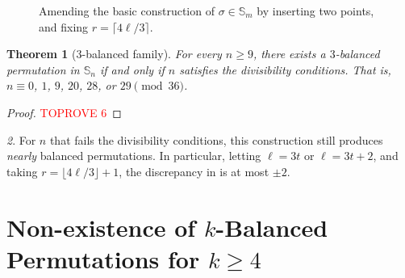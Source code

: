 \documentclass{article}
\newtheorem{theorem}{Theorem}[section]
\newcommand{\threeb}{$3$-balanced\xspace}
\newcommand{\Sn}{\mathbb{S}_n}
\theoremstyle{remark}
\newtheorem{rem}[theorem]{\protect\remarkname}
\providecommand{\remarkname}{Remark}
\theoremstyle{plain}
\begin{document}
\begin{figure}[H]
    \centering
    \caption{Amending the basic construction of $\sigma\in\mathbb{S}_m$ by inserting two points, and fixing  $r=
    \lceil 4\ell / 3 \rceil$.}
    \label{fig:inc_segments_dec_with2}
\end{figure}
\begin{theorem}[$3$-balanced family]
    \label{thm:3balanced_construction}
    For every $n \ge 9$, there exists a \threeb permutation in $\Sn$ if and only if $n$ satisfies the divisibility conditions. That is, $n\equiv 0$, $1$, $9$, $20$, $28$, or $29 \pmod {36}$.
\end{theorem}

\begin{proof}\textcolor{red}{TOPROVE 6}\end{proof}
\begin{rem}
    For $n$ that fails the divisibility conditions, this construction still produces \emph{nearly} balanced permutations. In particular, letting $\ell=3t$ or $\ell=3t+2$, and taking $r=\lfloor 4\ell/3 \rfloor +1$, the discrepancy in  is at most $\pm 2$.
\end{rem}
 \section{Non-existence of \texorpdfstring{$k$}{k}-Balanced Permutations for \texorpdfstring{$k \ge 4$}{k >= 4}}
\label{section:4balanced_nonex}
\end{document}
